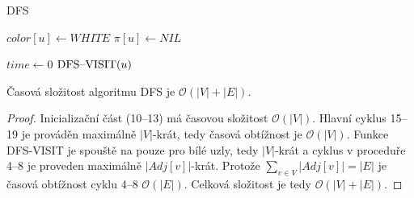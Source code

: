         \begin{algorithm}
            \DontPrintSemicolon
            \caption{DFS}
            \vspace*{0.5em}

            \vspace*{0.5em}

            {
                $color[u] \leftarrow \textit{WHITE}$\;
                $\pi[u] \leftarrow \textit{NIL}$\;
            }
            \vspace*{0.5em}

            $time \leftarrow 0$\;
            {
                {
                    $\textnormal{DFS--VISIT}(u)$\;
                }
            }
            \vspace*{0.5em}


        \end{algorithm}

        \newpage

        \begin{theorem}
            Časová složitost algoritmu DFS je $\mathcal{O}(|V| + |E|)$.
        \end{theorem}

        \begin{proof}
            Inicializační část (10--13) má časovou složitost $\mathcal{O}(|V|)$. Hlavní cyklus 15--19 je prováděn maximálně $|V|$-krát, tedy časová obtížnost je $\mathcal{O}(|V|)$. Funkce DFS-VISIT je spouště na pouze pro bílé uzly, tedy $|V|$-krát a cyklus v proceduře 4--8 je proveden maximálně $|Adj[v]|$-krát. Protože $\sum_{v \in V}|Adj[v]| = |E|$ je časová obtížnost cyklu 4--8 $\mathcal{O}(|E|)$. Celková složitost je tedy $\mathcal{O}(|V| + |E|)$.
        \end{proof}

